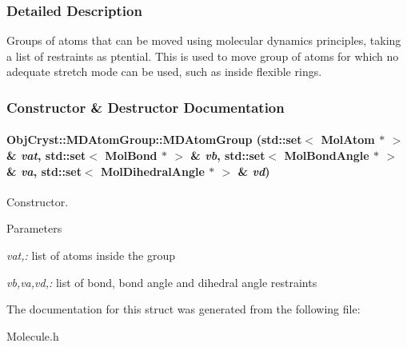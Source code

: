 \subsubsection{Detailed Description}
Groups of atoms that can be moved using molecular dynamics principles, taking a list of restraints as ptential. This is used to move group of atoms for which no adequate stretch mode can be used, such as inside flexible rings. 

\subsubsection{Constructor \& Destructor Documentation}
\paragraph[{MDAtomGroup}]{\setlength{\rightskip}{0pt plus 5cm}ObjCryst::MDAtomGroup::MDAtomGroup (std::set$<$ {\bf MolAtom} $\ast$ $>$ \& {\em vat}, \/  std::set$<$ {\bf MolBond} $\ast$ $>$ \& {\em vb}, \/  std::set$<$ {\bf MolBondAngle} $\ast$ $>$ \& {\em va}, \/  std::set$<$ {\bf MolDihedralAngle} $\ast$ $>$ \& {\em vd})}\hfill\label{a00041_a86dd6c6277666fa607685736bdffbedc}


Constructor. 
\begin{DoxyParams}{Parameters}
\item[{\em vat,:}]list of atoms inside the group \item[{\em vb,va,vd,:}]list of bond, bond angle and dihedral angle restraints \end{DoxyParams}


The documentation for this struct was generated from the following file:\begin{DoxyCompactItemize}
\item 
Molecule.h\end{DoxyCompactItemize}

